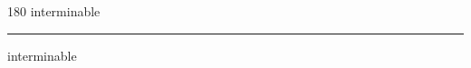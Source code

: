 
\begin{frame}
\begin{center}
\begin{turn}{180}
{\fontsize{2.5cm}{1em}\selectfont interminable}
\end{turn}
\vspace{1em}\par  
\hrule
\vspace{1em}\par  
{\fontsize{2.5cm}{1em}\selectfont interminable}
\end{center}
\end{frame}
